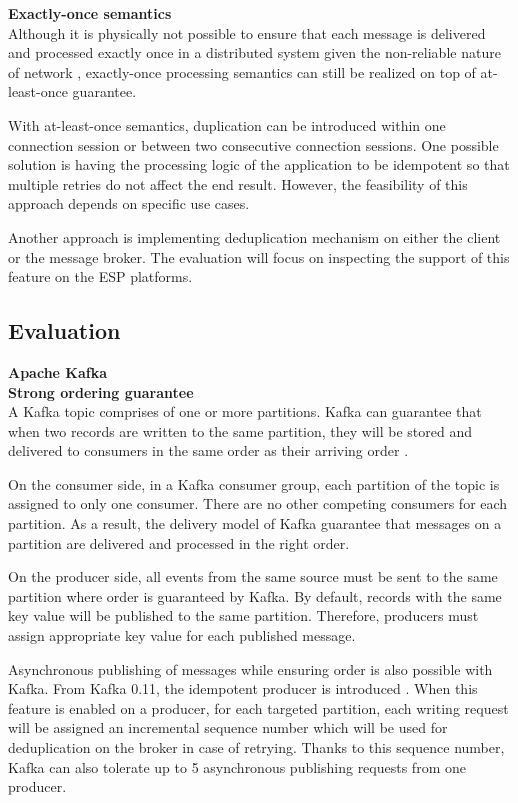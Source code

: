 \textbf{Exactly-once semantics}\\
Although it is physically not possible to ensure that each message is delivered and processed exactly once in a distributed system given the non-reliable nature of network \cite{exactlyoncenotpossible}, exactly-once processing semantics can still be realized on top of at-least-once guarantee. 

With at-least-once semantics, duplication can be introduced within one connection session or between two consecutive connection sessions. One possible solution is having the processing logic of the application to be idempotent so that multiple retries do not affect the end result. However, the feasibility of this approach depends on specific use cases.

Another approach is implementing deduplication mechanism on either the client or the message broker. The evaluation will focus on inspecting the support of this feature on the ESP platforms. 

\subsection{Evaluation}
\large \textbf{Apache Kafka}\\
\normalsize
\textbf{Strong ordering guarantee}\\
A Kafka topic comprises of one or more partitions. Kafka can guarantee that when two records are written to the same partition, they will be stored and delivered to consumers in the same order as their arriving order \cite{kafkaconfluentintro}.

On the consumer side, in a Kafka consumer group, each partition of the topic is assigned to only one consumer. There are no other competing consumers for each partition. As a result, the delivery model of Kafka guarantee that messages on a partition are delivered and processed in the right order.

On the producer side, all events from the same source must be sent to the same partition where order is guaranteed by Kafka. By default, records with the same key value will be published to the same partition. Therefore, producers must assign appropriate key value for each published message.

Asynchronous publishing of messages while ensuring order is also possible with Kafka. From Kafka 0.11, the idempotent producer is introduced \cite{kafkatransaction}. When this feature is enabled on a producer, for each targeted partition, each writing request will be assigned an incremental sequence number which will be used for deduplication on the broker in case of retrying. Thanks to this sequence number, Kafka can also tolerate up to 5 asynchronous publishing requests from one producer.

